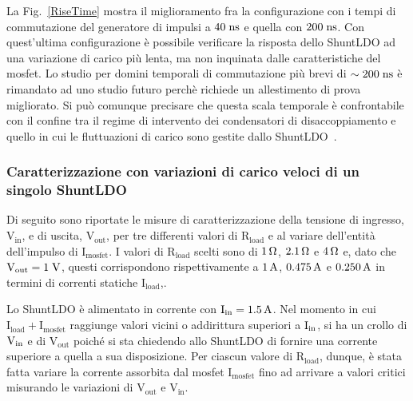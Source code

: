 La Fig.~\ref{RiseTime} mostra il miglioramento fra la configurazione con i tempi di commutazione del generatore di impulsi a $40 \rm \; ns$ e quella con $200 \rm \; ns$. Con quest'ultima configurazione è possibile verificare la risposta dello ShuntLDO ad una variazione di carico più lenta, ma non inquinata dalle caratteristiche del mosfet. Lo studio per domini temporali di commutazione pi\`u brevi di $\sim 200\rm \; ns$ \`e rimandato ad uno studio futuro perch\`e richiede un allestimento di prova migliorato. Si pu\`o comunque precisare che questa scala temporale \`e confrontabile con il confine tra il regime di intervento dei condensatori di disaccoppiamento e quello in cui le fluttuazioni di carico sono gestite dallo ShuntLDO~\cite{saramarconi}.
 

\subsubsection{Caratterizzazione con variazioni di carico veloci di un singolo ShuntLDO}

Di seguito sono riportate le misure di caratterizzazione della tensione di ingresso, $\mathrm{V_{in}}$, e di uscita, $\mathrm{V_{out}}$, per tre differenti valori di $\mathrm{R_{load}}$ e al variare dell'entit\`a dell'impulso di $\mathrm{I_{mosfet}}$.
I valori di $\mathrm{R_{load}}$ scelti sono di $1{\rm \, \Omega}$, $2.1{\rm \, \Omega}$ e $4{\rm \, \Omega}$ e, dato che $\mathrm{V_{out}=1\rm \; V}$, questi corrispondono rispettivamente a $1\rm \, A$, $0.475\rm \, A$ e $0.250\rm \, A$ in termini di correnti statiche $\mathrm{I_{load}}$,.

Lo ShuntLDO è alimentato in corrente con $\mathrm{I_{in}} = 1.5\rm \, A$. Nel momento in cui $\mathrm{I_{load}+I_{mosfet}}$ raggiunge valori vicini o addirittura superiori  a $\mathrm{I_{in}}$, si ha un crollo di $\mathrm{V_{in}}$ e di $\mathrm{V_{out}}$ poiché si sta chiedendo allo ShuntLDO di fornire una corrente superiore a quella a sua disposizione.
Per ciascun valore di $\mathrm{R_{load}}$, dunque, è stata fatta variare la corrente assorbita dal mosfet $\mathrm{I_{mosfet}}$ fino ad arrivare a valori critici misurando le variazioni di $\mathrm{V_{out}}$ e $\mathrm{V_{in}}$. 

